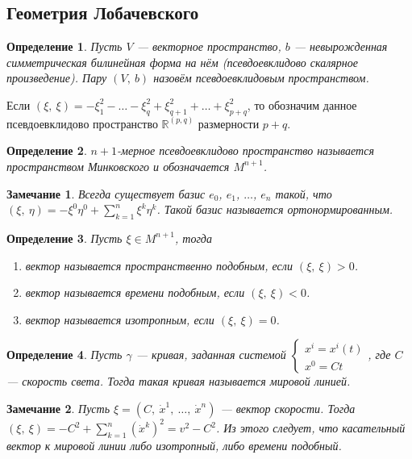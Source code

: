 \documentclass[12pt]{article}
\theoremstyle{plain}
\newtheorem{definition}{Определение}[section]
\newtheorem{remark}{Замечание}
\newcommand{\R}{\mathbb R}
\begin{document}
    \subsection{Геометрия Лобачевского}
    \begin{definition}
        Пусть $V$ --- векторное пространство, $b$ --- невырожденная симметрическая билинейная форма на нём (псевдоевклидово скалярное произведение). Пару $(V, \ b)$ назовём псевдоевклидовым пространством.
    \end{definition}
    Если $(\xi, \ \xi)=-\xi_1^2-\ldots-\xi_q^2+\xi_{q+1}^2+\ldots+\xi_{p+q}^2$, то обозначим данное псевдоевклидово пространство $\R^{(p, q)}$ размерности $p+q$.
    \begin{definition}
        $n+1$-мерное псевдоевклидово пространство называется пространством Минковского и обозначается $M^{n+1}$.
    \end{definition}
    \begin{remark}
        Всегда существует базис $e_0$, $e_1$, $\ldots$, $e_n$ такой, что $(\xi, \ \eta)=-\xi^0\eta^0+\sum\limits_{k=1}^n\xi^k\eta^k$. Такой базис называется ортонормированным.
    \end{remark}
    \begin{definition}
        Пусть $\xi\in M^{n+1}$, тогда
        \begin{enumerate}
            \item вектор называется пространственно подобным, если $(\xi, \ \xi)>0$.
            \item вектор называется времени подобным, если $(\xi, \ \xi)<0$.
            \item вектор называется изотропным, если $(\xi, \ \xi)=0$.
        \end{enumerate}
    \end{definition}
    \begin{definition}
        Пусть $\gamma$ --- кривая, заданная системой $\begin{cases}
            x^i=x^i(t)\\
            x^0=Ct
        \end{cases}$, где $C$ --- скорость света. Тогда такая кривая называется мировой линией.
    \end{definition}
    \begin{remark}
        Пусть $\xi=(C, \ \dot{x}^1, \ \ldots, \ \dot{x}^n)$ --- вектор скорости. Тогда $(\xi, \ \xi)=-C^2+\sum\limits_{k=1}^n(\dot{x}^k)^2=v^2-C^2$.
        Из этого следует, что касательный вектор к мировой линии либо изотропный, либо времени подобный.
    \end{remark}
\end{document}
